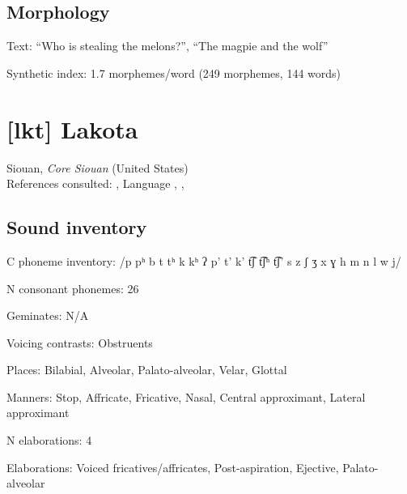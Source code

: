 {\subsection*{Morphology}

\begin{appendixdesc}

\item[Text:] “Who is stealing the melons?”, “The magpie and the wolf” \citep[448--456]{Haspelmath1993}

\item[Synthetic index:] 1.7 morphemes/word (249 morphemes, 144 words)
\end{appendixdesc}
\section*{[lkt] Lakota}  %
Siouan, \textit{Core Siouan} (United States)\medskip\\
References consulted: \citet{Ingham2003},  Language \citet{Consortium2008}, \citet{Mirzayan2010}, \citet{RoodTaylor1996}

\subsection*{Sound inventory}
\begin{appendixdesc}

\item[C phoneme inventory:] /p pʰ b t tʰ k kʰ ʔ p’ t’ k’ t͡ʃ t͡ʃʰ t͡ʃ’ s z ʃ ʒ x ɣ h m n l w j/

\item[N consonant phonemes:] 26

\item[Geminates:] N/A

\item[Voicing contrasts:] Obstruents

\item[Places:] Bilabial, Alveolar, Palato-alveolar, Velar, Glottal

\item[Manners:] Stop, Affricate, Fricative, Nasal, Central approximant, Lateral approximant

\item[N elaborations:] 4

\item[Elaborations:] Voiced fricatives/affricates, Post-aspiration, Ejective, Palato-alveolar


\end{appendixdesc}}

